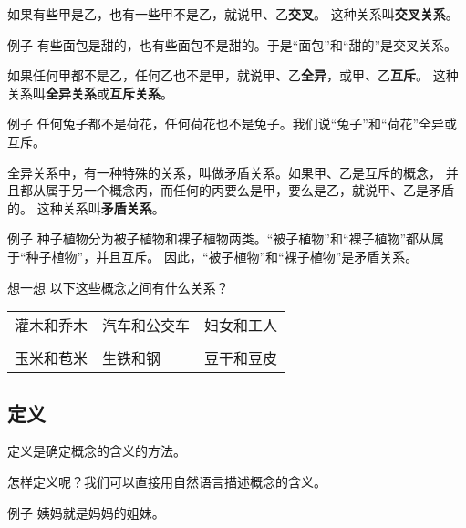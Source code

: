 \documentclass[12pt,UTF8,a4paper]{article}
\begin{document}
如果有些甲是乙，也有一些甲不是乙，就说甲、乙\textbf{交叉}。
这种关系叫\textbf{交叉关系}。

\begin{blockin}{例子}
    有些面包是甜的，也有些面包不是甜的。于是“面包”和“甜的”是交叉关系。
\end{blockin}

如果任何甲都不是乙，任何乙也不是甲，就说甲、乙\textbf{全异}，或甲、乙\textbf{互斥}。
这种关系叫\textbf{全异关系}或\textbf{互斥关系}。

\begin{blockin}{例子}
    任何兔子都不是荷花，任何荷花也不是兔子。我们说“兔子”和“荷花”全异或互斥。
\end{blockin}

全异关系中，有一种特殊的关系，叫做矛盾关系。如果甲、乙是互斥的概念，
并且都从属于另一个概念丙，而任何的丙要么是甲，要么是乙，就说甲、乙是矛盾的。
这种关系叫\textbf{矛盾关系}。

\begin{blockin}{例子}
    种子植物分为被子植物和裸子植物两类。“被子植物”和“裸子植物”都从属于“种子植物”，并且互斥。
    因此，“被子植物”和“裸子植物”是矛盾关系。
\end{blockin}

\begin{blockaft}{想一想}
    以下这些概念之间有什么关系？\\
    \begin{center}
        \begin{tabular}{p{8em}<{\centering} p{8em}<{\centering} p{8em}<{\centering} }
            灌木和乔木 & 汽车和公交车 & 妇女和工人 \\
            & & \\
            玉米和苞米 & 生铁和钢 & 豆干和豆皮 \\
        \end{tabular}
    \end{center}
\end{blockaft}

\subsection{定义}

定义是确定概念的含义的方法。

怎样定义呢？我们可以直接用自然语言描述概念的含义。

\begin{blockin}{例子}
姨妈就是妈妈的姐妹。 
\end{blockin}
\end{document}
